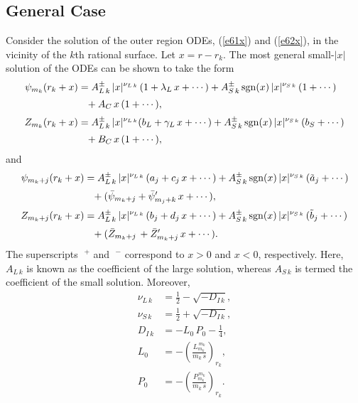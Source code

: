 \documentclass[12pt,prb,aps]{revtex4-1}
\begin{document}
\subsection{General Case}\label{sgen}
Consider the solution of the outer region ODEs, (\ref{e61x}) and (\ref{e62x}), in the
vicinity of the $k$th rational surface. Let  $x=r-r_k$.  The most general small-$|x|$ solution of the ODEs
can be shown to take the form\,\cite{am1,am3}
\begin{align}
\psi_{m_k}(r_k+x)&=A_{L\,k}^\pm \,|x|^{\nu_{L\,k}}\,(1+\lambda_{L}\,x+\cdots) + A_{S\,k}^{\pm}\,{\rm sgn}(x)\,|x|^{\nu_{S\,k}}\,(1+\cdots) \nonumber\\[0.5ex]
& \phantom{=}+ A_{C}\,x\,(1+\cdots),\label{ex1}\\[0.5ex]
Z_{m_k}(r_k+x)&= A_{L\,k}^\pm\,|x|^{\nu_{L\,k}}(b_{L}  + \gamma_{L}\,x+\cdots) + A_{S\,k}^{\pm}\,{\rm sgn}(x)\,|x|^{\nu_{S\,k}}\,(b_{S}+\cdots)\nonumber\\[0.5ex]
& \phantom{=}+ B_{C}\,x\,(1+\cdots),\label{ex2}
\end{align}
and 
\begin{align}
\psi_{m_k+j}(r_k+x)&=A_{L\,k}^\pm\,|x|^{\nu_{L\,k}}\,(a_j+c_j\,x+\cdots)  
+A_{S\,k}^\pm\,{\rm sgn}(x)\,|x|^{\nu_{S\,k}}\,(\tilde{a}_{j}+\cdots)\nonumber\\[0.5ex]
&\phantom{=}+ (\bar{\psi}_{m_k+j}+\bar{\psi}_{m_j+k}'\,x+\cdots),\\[0.5ex]
Z_{m_k+j}(r_k+x)&= A_{L\,k}^\pm\,|x|^{\nu_{L\,k}}\,(b_j+d_j\,x+\cdots) +A_{S\,k}^\pm\,{\rm sgn}(x)\,|x|^{\nu_{S\,k}}\,(\tilde{b}_{j}+\cdots)\nonumber\\[0.5ex]
&\phantom{=}+(\bar{Z}_{m_k+j}\,+\bar{Z}_{m_k+j}'\,x+\cdots).\label{ex4}
\end{align}
The superscripts $\phantom{!}^+$ and $\phantom{!}^-$ correspond  to $x>0$ and $x<0$, respectively. Here, $A_{L\,k}$ is known as the coefficient of
the large solution, whereas $A_{S\,k}$ is termed the coefficient of the small solution. \cite{am1,am3,ggj}
Moreover, 
\begin{align}
\nu_{L\,k}&= \frac{1}{2}-\sqrt{-D_{I\,k}},\label{nul}\\[0.5ex]
\nu_{S\,k} &=  \frac{1}{2}+\sqrt{-D_{I\,k}},\label{nus}\\[0.5ex]
D_{I\,k} &= -L_0\,P_0-\frac{1}{4},\\[0.5ex]
L_0 &=-\left(\frac{L_{m_k}^{\,m_k}}{m_k\,s}\right)_{r_k},\label{lkk}\\[0.5ex]
P_0 &= -\left(\frac{P_{m_k}^{\,m_k}}{m_k\,s}\right)_{r_k}.\label{pkk}
\end{align}
\end{document}
